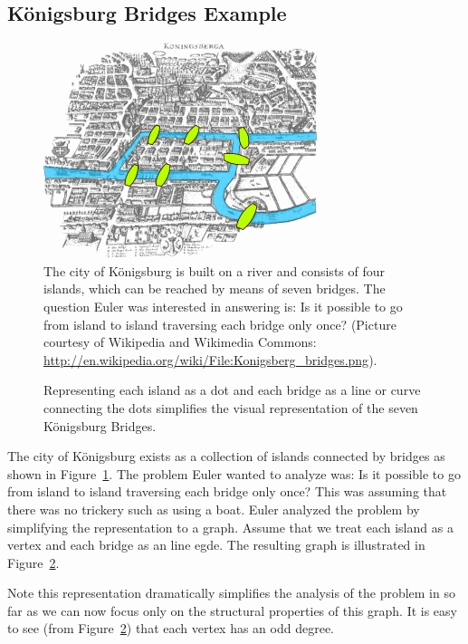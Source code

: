 \subsection{K\"onigsburg Bridges Example}
\begin{figure}
\centering
\includegraphics[scale=1]{figs/konigsberg_bridges}
\caption{\label{fig:bridge}%
The city of Königsburg is built on a river and consists of four islands, which can be reached by means of seven bridges.
The question Euler was interested in answering is: Is it possible to go from island to island traversing each bridge only once?
(Picture courtesy of Wikipedia and Wikimedia Commons: \url{http://en.wikipedia.org/wiki/File:Konigsberg_bridges.png}).
}%
\end{figure}
%
\begin{figure}
\centering

\caption{\label{fig:graphbridges}%
Representing each island as a dot and each bridge as a line or curve connecting the dots simplifies the visual representation of the seven Königsburg Bridges.
}%
\end{figure}
%
\begin{example}
The city of Königsburg exists as a collection of islands connected by bridges as shown in Figure~\ref{fig:bridge}.
The problem Euler wanted to analyze was: Is it possible to go from island to island traversing each bridge only once?
This was assuming that there was no trickery such as using a boat.
Euler analyzed the problem by simplifying the representation to a graph.
Assume that we treat each island as a vertex and each bridge as an line egde.
The resulting graph is illustrated in Figure~\ref{fig:graphbridges}.
\end{example}
%
Note this representation dramatically simplifies the analysis of the problem in so far as we can now focus only on the structural properties of this graph.
It is easy to see (from Figure~\ref{fig:graphbridges}) that each vertex has an odd degree.
